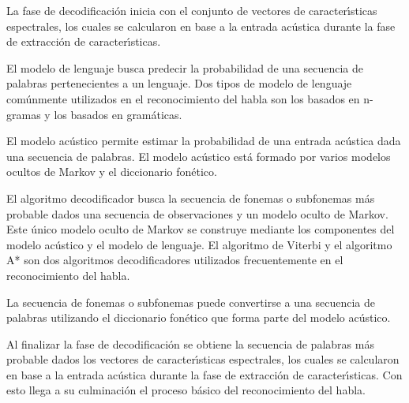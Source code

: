 La fase de decodificaci\'on inicia con el conjunto de vectores de caracter{\'\i}sticas espectrales,
los cuales se calcularon en base a la entrada ac\'ustica durante la fase de extracci\'on de caracter{\'\i}sticas.

El modelo de lenguaje busca predecir la probabilidad de una secuencia de palabras pertenecientes a un lenguaje.
Dos tipos de modelo de lenguaje com\'unmente utilizados en el reconocimiento del habla son los basados en
n-gramas y los basados en gram\'aticas.

El modelo ac\'ustico permite estimar la probabilidad de una entrada ac\'ustica dada una secuencia de palabras.
El modelo ac\'ustico est\'a formado por varios modelos ocultos de Markov y el diccionario fon\'etico.

El algoritmo decodificador busca la secuencia de fonemas o subfonemas m\'as probable dados una 
secuencia de observaciones y un modelo oculto de Markov. Este \'unico modelo oculto de Markov se construye
mediante los componentes del modelo ac\'ustico y el modelo de lenguaje. El algoritmo de Viterbi y el 
algoritmo A* son dos algoritmos decodificadores utilizados frecuentemente en el reconocimiento del habla.

La secuencia de fonemas o subfonemas puede convertirse a una secuencia de palabras utilizando el diccionario
fon\'etico que forma parte del modelo ac\'ustico.

Al finalizar la fase de decodificaci\'on se obtiene la secuencia de palabras m\'as probable dados los vectores
de caracter{\'\i}sticas espectrales, los cuales se calcularon en base a la entrada ac\'ustica durante
la fase de extracci\'on de caracter{\'\i}sticas. Con esto llega a su culminaci\'on el proceso b\'asico
del reconocimiento del habla.